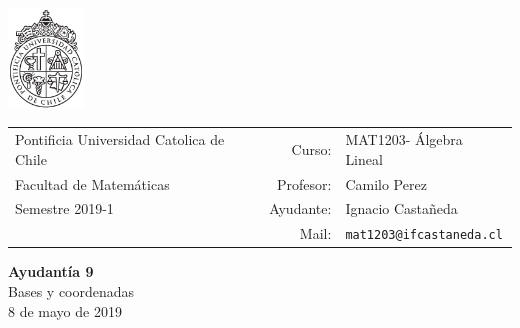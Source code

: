 \documentclass[12pt]{article}
\makeatletter
\newcommand{\ayudantia}{{\sc Ayudantía 9}}
\newcommand{\tituloayu}{Bases y coordenadas}
\newcommand{\fecha}{8 de mayo de 2019}
\newcommand{\sigla}{MAT1203}
\newcommand{\nombre}{Álgebra Lineal}
\newcommand{\profesor}{Camilo Perez}
\newcommand{\ano}{2019}
\newcommand{\semestre}{1}
\newcommand{\mail}{mat1203@ifcastaneda.cl}
\makeatother
\begin{document}
\thispagestyle{empty}

\begin{minipage}{2cm}
	\includegraphics[width=2cm]{../../../../img/logo.pdf}
	\vspace{0.5cm}
\end{minipage}
\begin{minipage}{\linewidth}
	\begin{tabular}{lrl}
		{\scriptsize\sc Pontificia Universidad Catolica de Chile} & \hspace*{0.7in}Curso: &
		\sigla  - \nombre\\
		{\sc Facultad de Matemáticas}&
		Profesor: & \profesor \\
		{\sc Semestre \ano-\semestre} & Ayudante: & {Ignacio Castañeda}\\
		& {Mail:} & \texttt{\mail}
	\end{tabular}
\end{minipage}

\vspace{-10mm}
\begin{center}
	{\LARGE\bf \ayudantia}\\
	\vspace{0.1cm}
	{\tituloayu}\\
	\vspace{0.1cm}
	\fecha\\
	\vspace{0.4cm}
\end{center}
\end{document}
